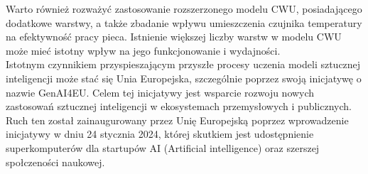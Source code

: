 \documentclass[a4paper,twoside,12pt]{book}
\begin{document}
Warto również rozważyć zastosowanie rozszerzonego modelu CWU, posiadającego dodatkowe warstwy, a także zbadanie wpływu umieszczenia czujnika temperatury na efektywność pracy pieca. Istnienie większej liczby warstw w modelu CWU może mieć istotny wpływ na jego funkcjonowanie i wydajności.\\

Istotnym czynnikiem przyspieszającym przyszłe procesy uczenia modeli sztucznej inteligencji może stać się Unia Europejska, szczególnie poprzez swoją inicjatywę o nazwie GenAI4EU\cite{bib:Unia_Ai}. Celem tej inicjatywy jest wsparcie rozwoju nowych zastosowań sztucznej inteligencji w ekosystemach przemysłowych i publicznych. Ruch ten został zainaugurowany przez Unię Europejską poprzez wprowadzenie inicjatywy w dniu 24 stycznia 2024, której skutkiem jest udostępnienie superkomputerów dla startupów AI (Artificial intelligence) oraz szerszej społczeności naukowej.






\end{document}
